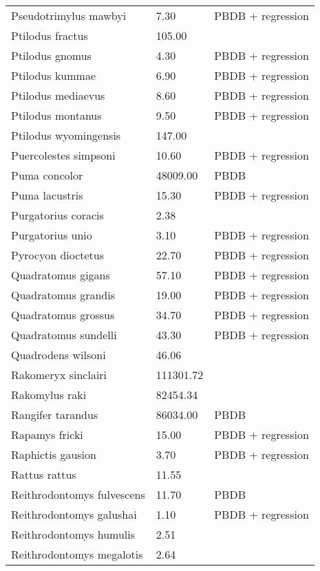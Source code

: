\begin{longtable}{p{} p{} p{}}
    Pseudotrimylus mawbyi & 7.30 & PBDB + regression \\ 
    Ptilodus fractus & 105.00 & \cite{Wilson2012} \\ 
    Ptilodus gnomus & 4.30 & PBDB + regression \\ 
    Ptilodus kummae & 6.90 & PBDB + regression \\ 
    Ptilodus mediaevus & 8.60 & PBDB + regression \\ 
    Ptilodus montanus & 9.50 & PBDB + regression \\ 
    Ptilodus wyomingensis & 147.00 & \cite{Wilson2012} \\ 
    Puercolestes simpsoni & 10.60 & PBDB + regression \\ 
    Puma concolor & 48009.00 & PBDB \\ 
    Puma lacustris & 15.30 & PBDB + regression \\ 
    Purgatorius coracis & 2.38 & \cite{Scott1937} \\ 
    Purgatorius unio & 3.10 & PBDB + regression \\ 
    Pyrocyon dioctetus & 22.70 & PBDB + regression \\ 
    Quadratomus gigans & 57.10 & PBDB + regression \\ 
    Quadratomus grandis & 19.00 & PBDB + regression \\ 
    Quadratomus grossus & 34.70 & PBDB + regression \\ 
    Quadratomus sundelli & 43.30 & PBDB + regression \\ 
    Quadrodens wilsoni & 46.06 & \cite{Tomiya2013} \\ 
    Rakomeryx sinclairi & 111301.72 & \cite{Tomiya2013} \\ 
    Rakomylus raki & 82454.34 & \cite{Tomiya2013} \\ 
    Rangifer tarandus & 86034.00 & PBDB \\ 
    Rapamys fricki & 15.00 & PBDB + regression \\ 
    Raphictis gausion & 3.70 & PBDB + regression \\ 
    Rattus rattus & 11.55 & \cite{Smith2004} \\ 
    Reithrodontomys fulvescens & 11.70 & PBDB \\ 
    Reithrodontomys galushai & 1.10 & PBDB + regression \\ 
    Reithrodontomys humulis & 2.51 & \cite{Smith2004} \\ 
    Reithrodontomys megalotis & 2.64 & \cite{Smith2004} \\ 

\end{longtable}
